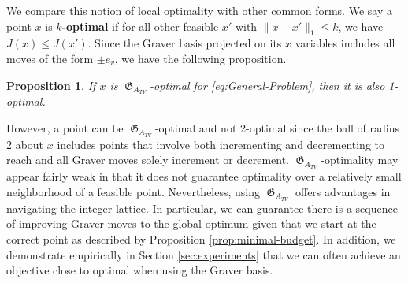 \documentclass[pdflatex,sn-mathphys-num]{sn-jnl}%
\newtheorem{prop}[theorem]{Proposition}
\DeclareMathOperator{\Gfrak}{\mathfrak{G}}
\begin{document}
We compare this notion of local optimality with other common forms. We say a point $x$ is \textbf{$k$-optimal} if for all other feasible $x'$ with $\|x - x'\|_1 \le k$, we have $J(x) \le J(x')$. Since the Graver basis projected on its $x$ variables includes all moves of the form $\pm e_v$, we have the following proposition.
\begin{prop}
    If $x$ is $\Gfrak_{A_{TV}}$-optimal for \eqref{eq:General-Problem}, then it is also 1-optimal.
\end{prop}
However, a point can be $\Gfrak_{A_{TV}}$-optimal and not 2-optimal since the ball of radius 2 about $x$ includes points that involve both incrementing and decrementing to reach and all Graver moves solely increment or decrement. $\Gfrak_{A_{TV}}$-optimality may appear fairly weak in that it does not guarantee optimality over a relatively small neighborhood of a feasible point.
Nevertheless, using $\Gfrak_{A_{TV}}$ offers advantages in navigating the integer lattice.
In particular, we can guarantee there is a sequence of improving Graver moves to the global optimum given that we start at the correct point as described by Proposition \ref{prop:minimal-budget}. In addition, we demonstrate empirically in Section \ref{sec:experiments} that we can often achieve an objective close to optimal when using the Graver basis.
\end{document}
